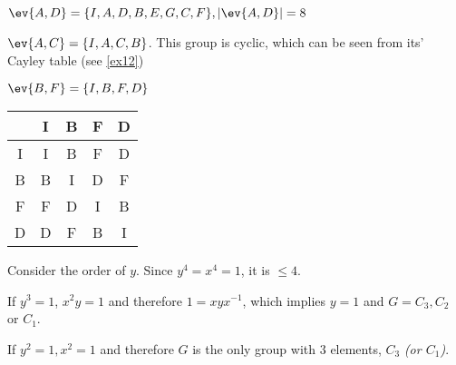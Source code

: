 \begin{exercise}
    \(\ev{A, D} = \{I, A, D, B, E, G, C, F\}, |\ev{A, D}| = 8\)

    \(\ev{A, C} = \{I, A, C, B\}\). This group is cyclic, which can be seen from its' Cayley table (see \ref{ex12})

    \(\ev{B, F} = \{I, B, F, D\}\)
    \begin{center}
        \begin{tabular}{C|C|C|C|C}
              & I & B & F & D \\ \hline
            I & I & B & F & D \\
            B & B & I & D & F \\
            F & F & D & I & B \\
            D & D & F & B & I \\
        \end{tabular}
    \end{center}
\end{exercise}

\begin{solution}
    Consider the order of \(y\). Since \(y^4 = x^4 = 1\), it is \(\leq 4\).

    If \(y^3 = 1\), \(x^2y = 1\) and therefore \(1 = xyx^{ - 1}\), which implies \(y = 1\) and \(G = C_3, C_2\) or \(C_1\).

    If \(y^2 = 1, x^2 = 1\) and therefore \(G\) is the only group with \(3\) elements, \(C_3\) \textit{(or \(C_1\))}.
\end{solution}